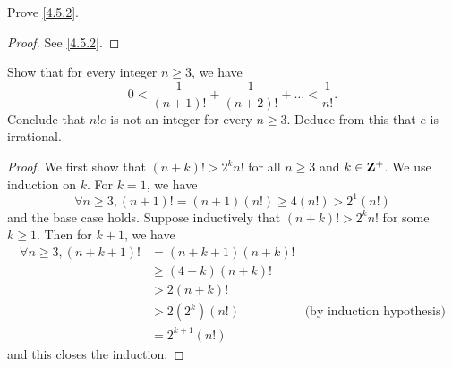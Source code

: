\exercisesection

\begin{exercise}\label{ex 4.5.1}
  Prove \cref{4.5.2}.
\end{exercise}

\begin{proof}
  See \cref{4.5.2}.
\end{proof}

\begin{exercise}\label{ex 4.5.2}
  Show that for every integer \(n \geq 3\), we have
  \[
    0 < \frac{1}{(n + 1)!} + \frac{1}{(n + 2)!} + \dots < \frac{1}{n!}.
  \]
  Conclude that \(n! e\) is not an integer for every \(n \geq 3\).
  Deduce from this that \(e\) is irrational.
\end{exercise}

\begin{proof}
  We first show that \((n + k)! > 2^k n!\) for all \(n \geq 3\) and \(k \in \mathbf{Z}^+\).
  We use induction on \(k\).
  For \(k = 1\), we have
  \[
    \forall n \geq 3, (n + 1)! = (n + 1) (n!) \geq 4 (n!) > 2^1 (n!)
  \]
  and the base case holds.
  Suppose inductively that \((n + k)! > 2^k n!\) for some \(k \geq 1\).
  Then for \(k + 1\), we have
  \begin{align*}
    \forall n \geq 3, (n + k + 1)! & = (n + k + 1) (n + k)!                                    \\
                                   & \geq (4 + k)(n + k)!                                      \\
                                   & > 2 (n + k)!                                              \\
                                   & > 2 (2^k) (n!)         & \text{(by induction hypothesis)} \\
                                   & = 2^{k + 1} (n!)
  \end{align*}
  and this closes the induction.


\end{proof}
